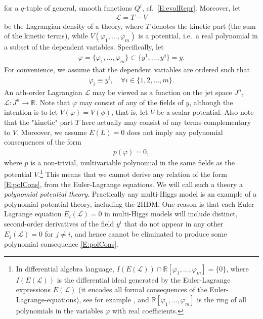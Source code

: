 \documentclass[a4paper,hidelinks, 12pt]{article}
\numberwithin{equation}{section}
\theoremstyle{plain}
\newcommand{\N}[1]{\mathbb{#1}}
\newcommand{\mc}{\mathcal}
\begin{document}
for a $q$-tuple of general, smooth functions $Q^i$, cf.~\eqref{E:evolRepr}.
Moreover, let 
\begin{align}
\mc{L}=T-V 	
\end{align}
be the Lagrangian density of a theory, where $T$ denotes the kinetic part (the sum of the kinetic terms), while $V(\varphi_1,\ldots,\varphi_m)$ is a potential, i.e.~a real polynomial in a subset of the dependent variables. Specifically,
let
\begin{align}\label{E:varphiSubsety}
	\varphi=\{\varphi_1,\ldots,\varphi_m\}\subset \{y^1,\ldots,y^q\}=y.
\end{align}
For convenience, we assume that the dependent variables are ordered such that
\begin{align}
	\varphi_i\equiv y^i, \quad \forall i\in \{1,2,\ldots, m\}.
\end{align}
An $n$th-order Lagrangian $\mathcal{L}$ may be viewed as a function on the jet
space $J^n$, $\mathcal{L}:J^n\to\N{R}$. Note that $\varphi$ may consist of any of the fields of $y$, although the intention is to let $V(\varphi)=V(\phi)$, that is, let $V$ be a scalar potential. Also note that the "kinetic" part $T$ here actually may consist of any terms complementary to $V$. 
 Moreover, we assume $E(L)=0$ does not imply any polynomial consequences of the form  
\begin{align}\label{E:polCons}
	p(\varphi)=0,
\end{align}
where $p$ is a non-trivial, multivariable polynomial in the same fields as the potential $V$.\footnote{In differential algebra language, $I(E(\mc{L}))\cap \N{R}[\varphi_1,\ldots,\varphi_m]=\{0\}$, where $I(E(\mc{L}))$ is the differential ideal generated by the Euler-Lagrange expressions $E(\mc{L})$ (it encodes all formal consequences of the Euler-Lagrange-equations), see for example \cite{Robertz2018}, and $\N{R}[\varphi_1,\ldots,\varphi_m]$ is the ring of all polynomials in the variables $\varphi$ with real coefficients.} This means that we cannot derive any relation of the form \eqref{E:polCons}, from the Euler-Lagrange equations.
We will call such a theory a \textit{polynomial potential theory}. Practically any multi-Higgs model is an example of a polynomial potential theory, including the 2HDM. One reason is that each Euler-Lagrange equation $E_i(\mc{L})=0$ in multi-Higgs models will include distinct, second-order derivatives of the field $y^i$ that do not appear in any other $E_j(\mc{L})=0$ for $j\ne i$, and hence cannot be eliminated to produce some polynomial consequence \eqref{E:polCons}.
\end{document}
